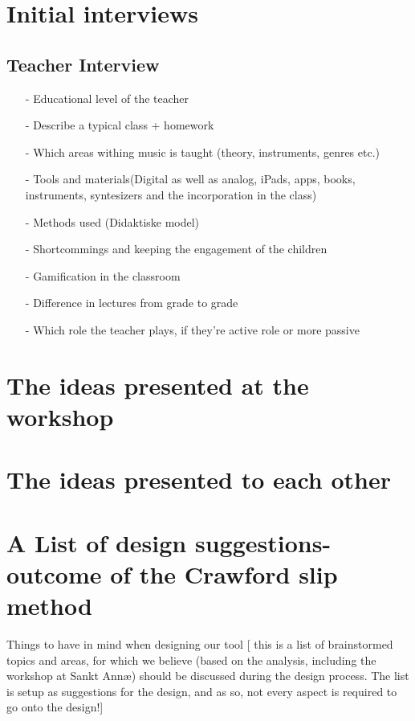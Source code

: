 \section{Initial interviews}\label{sec:initialInterviews}
	\subsection{Teacher Interview}
		\begin{itemize}
		\item[-] Educational level of the teacher 
		\item[-] Describe a typical class + homework
		\item[-] Which areas withing music is taught (theory, instruments, genres etc.)
		\item[-] Tools and materials(Digital as well as analog, iPads, apps, books, instruments, syntesizers and the incorporation in the class)
		\item[-] Methods used (Didaktiske model)
		\item[-] Shortcommings and keeping the engagement of the children
		\item[-] Gamification in the classroom
		\item[-] Difference in lectures from grade to grade
		\item[-] Which role the teacher plays, if they're active role or more passive
		\end{itemize}
	
	
\section{The ideas presented at the workshop}
\section{The ideas presented to each other}
\section{A List of design suggestions- outcome of the Crawford slip method}\label{CrawfordSlipList}
Things to have in mind when designing our tool
[ this is a list of brainstormed topics and areas, for which we believe (based on the analysis, including the workshop at Sankt Annæ) should be discussed during the design process. The list is setup as suggestions for the design, and as so, not every aspect is required to go onto the design!]

